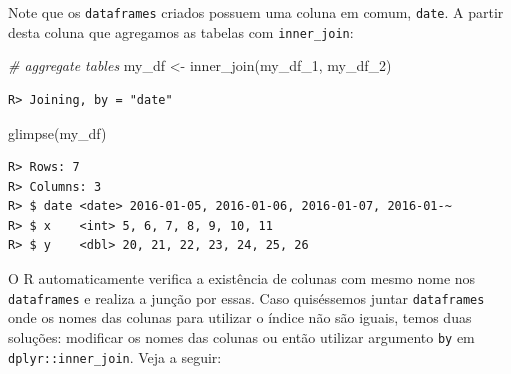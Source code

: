 \documentclass[
  11pt,
]{book}
\newenvironment{Shaded}{\begin{snugshade}}{\end{snugshade}}
\newcommand{\CommentTok}[1]{\textcolor[rgb]{0.37,0.37,0.37}{\textit{#1}}}
\newcommand{\FunctionTok}[1]{\textcolor[rgb]{0,0,0}{#1}}
\newcommand{\NormalTok}[1]{#1}
\newcommand{\OtherTok}[1]{\textcolor[rgb]{0.37,0.37,0.37}{#1}}
\begin{document}
Note que os \texttt{dataframes} criados possuem uma coluna em comum, \texttt{date}. A partir desta coluna que agregamos as tabelas com \texttt{inner\_join}:

\begin{Shaded}
\begin{Highlighting}[]
\CommentTok{\# aggregate tables}
\NormalTok{my\_df }\OtherTok{\textless{}{-}} \FunctionTok{inner\_join}\NormalTok{(my\_df\_1, my\_df\_2)}
\end{Highlighting}
\end{Shaded}

\begin{verbatim}
R> Joining, by = "date"
\end{verbatim}

\begin{Shaded}
\begin{Highlighting}[]
\FunctionTok{glimpse}\NormalTok{(my\_df)}
\end{Highlighting}
\end{Shaded}

\begin{verbatim}
R> Rows: 7
R> Columns: 3
R> $ date <date> 2016-01-05, 2016-01-06, 2016-01-07, 2016-01-~
R> $ x    <int> 5, 6, 7, 8, 9, 10, 11
R> $ y    <dbl> 20, 21, 22, 23, 24, 25, 26
\end{verbatim}

O R automaticamente verifica a existência de colunas com mesmo nome nos \texttt{dataframes} e realiza a junção por essas. Caso quiséssemos juntar \texttt{dataframes} onde os nomes das colunas para utilizar o índice não são iguais, temos duas soluções: modificar os nomes das colunas ou então utilizar argumento \texttt{by} em \texttt{dplyr::inner\_join}. Veja a seguir:
\end{document}
